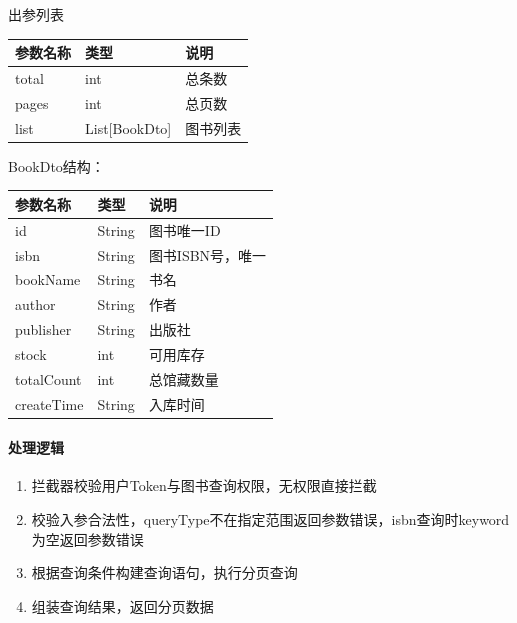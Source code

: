 \documentclass[12pt, a4paper]{article}
\begin{document}
出参列表

\begin{table}[H]
    \centering
    \begin{tabular}{|l|l|l|}
        \hline
        参数名称 & 类型 & 说明 \\
        \hline
        total & int & 总条数 \\
        \hline
        pages & int & 总页数 \\
        \hline
        list & List[BookDto] & 图书列表 \\
        \hline
    \end{tabular}
\end{table}

BookDto结构：

\begin{table}[H]
    \centering
    \begin{tabular}{|l|l|l|}
        \hline
        参数名称 & 类型 & 说明 \\
        \hline
        id & String & 图书唯一ID \\
        \hline
        isbn & String & 图书ISBN号，唯一 \\
        \hline
        bookName & String & 书名 \\
        \hline
        author & String & 作者 \\
        \hline
        publisher & String & 出版社 \\
        \hline
        stock & int & 可用库存 \\
        \hline
        totalCount & int & 总馆藏数量 \\
        \hline
        createTime & String & 入库时间 \\
        \hline
    \end{tabular}
\end{table}

\paragraph{处理逻辑}
\begin{enumerate}
\item 拦截器校验用户Token与图书查询权限，无权限直接拦截

\item 校验入参合法性，queryType不在指定范围返回参数错误，isbn查询时keyword为空返回参数错误

\item 根据查询条件构建查询语句，执行分页查询

\item 组装查询结果，返回分页数据
\end{enumerate}
\end{document}
